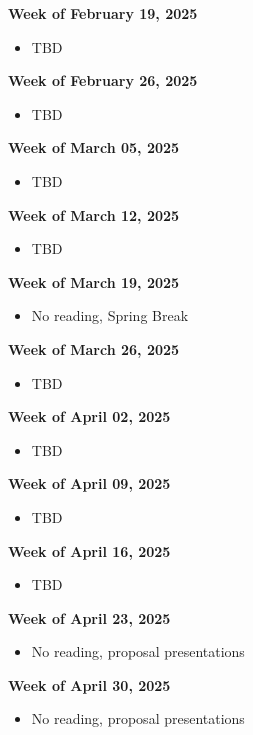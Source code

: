 \documentclass[12pt, notitlepage]{article}   	%
\begin{document}
{\textbf{Week of February 19, 2025}
\begin{itemize}
    \item TBD
\end{itemize}

\textbf{Week of February 26, 2025}
\begin{itemize}
    \item TBD
\end{itemize}

\textbf{Week of March 05, 2025}
\begin{itemize}
    \item TBD
\end{itemize}

\textbf{Week of March 12, 2025}
\begin{itemize}
    \item TBD
\end{itemize}

\textbf{Week of March 19, 2025}
\begin{itemize}
    \item No reading, Spring Break
\end{itemize}

\textbf{Week of March 26, 2025}
\begin{itemize}
    \item TBD
\end{itemize}

\textbf{Week of April 02, 2025}
\begin{itemize}
    \item TBD
\end{itemize}

\textbf{Week of April 09, 2025}
\begin{itemize}
    \item TBD
\end{itemize}

\textbf{Week of April 16, 2025}
\begin{itemize}
    \item TBD
\end{itemize}

\textbf{Week of April 23, 2025}
\begin{itemize}
    \item No reading, proposal presentations
\end{itemize}

\textbf{Week of April 30, 2025}
\begin{itemize}
    \item No reading, proposal presentations
\end{itemize}

} %
\end{document}
